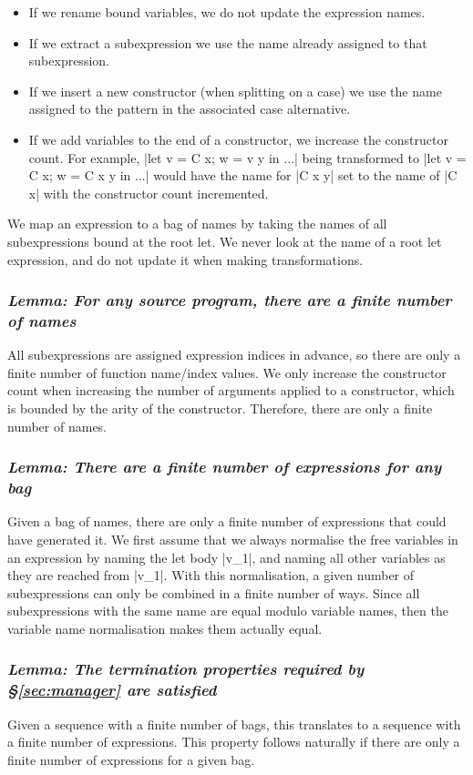 \documentclass[draft]{sigplanconf}
\newcommand{\lemma}[1]{\subsubsection*{\textit{Lemma: #1}}}
\begin{document}
\begin{itemize}
\item If we rename bound variables, we do not update the expression names.
\item If we extract a subexpression we use the name already assigned to that subexpression.
\item If we insert a new constructor (when splitting on a case) we use the name assigned to the pattern in the associated case alternative.
\item If we add variables to the end of a constructor, we increase the constructor count. For example, |let v = C x; w = v y in ...| being transformed to |let v = C x; w = C x y in ...| would have the name for |C x y| set to the name of |C x| with the constructor count incremented.
\end{itemize}

We map an expression to a bag of names by taking the names of all subexpressions bound at the root let. We never look at the name of a root let expression, and do not update it when making transformations.

\lemma{For any source program, there are a finite number of names}

All subexpressions are assigned expression indices in advance, so there are only a finite number of function name/index values. We only increase the constructor count when increasing the number of arguments applied to a constructor, which is bounded by the arity of the constructor. Therefore, there are only a finite number of names.

\lemma{There are a finite number of expressions for any bag}


Given a bag of names, there are only a finite number of expressions that could have generated it. We first assume that we always normalise the free variables in an expression by naming the let body |v_1|, and naming all other variables as they are reached from |v_1|. With this normalisation, a given number of subexpressions can only be combined in a finite number of ways. Since all subexpressions with the same name are equal modulo variable names, then the variable name normalisation makes them actually equal.

\lemma{The termination properties required by \S\ref{sec:manager} are satisfied}

Given a sequence with a finite number of bags, this translates to a sequence with a finite number of expressions. This property follows naturally if there are only a finite number of expressions for a given bag.
\end{document}
